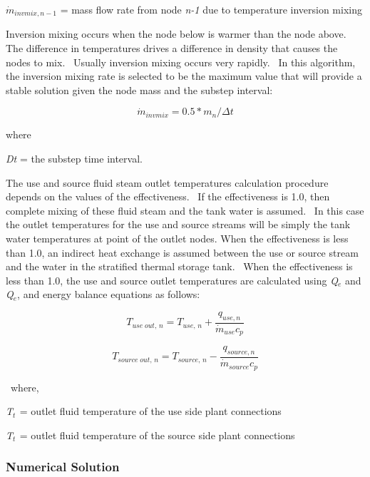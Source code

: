 \({\dot m_{invmix,n - 1}}\) = mass flow rate from node \emph{n-1} due to temperature inversion mixing

Inversion mixing occurs when the node below is warmer than the node above.~ The difference in temperatures drives a difference in density that causes the nodes to mix.~ Usually inversion mixing occurs very rapidly.~ In this algorithm, the inversion mixing rate is selected to be the maximum value that will provide a stable solution given the node mass and the substep interval:

\begin{equation}
{\dot m_{invmix}} = 0.5*{m_n}/\Delta t
\end{equation}

where

\emph{Dt} = the substep time interval.

The use and source fluid steam outlet temperatures calculation procedure depends on the values of the effectiveness.~ If the effectiveness is 1.0, then complete mixing of these fluid steam and the tank water is assumed.~ In this case the outlet temperatures for the use and source streams will be simply the tank water temperatures at point of the outlet nodes. When the effectiveness is less than 1.0, an indirect heat exchange is assumed between the use or source stream and the water in the stratified thermal storage tank.~ When the effectiveness is less than 1.0, the use and source outlet temperatures are calculated using \emph{Q\(_{e}\)} and \emph{Q\(_{e}\)}, and energy balance equations as follows:

\begin{equation}
{T_{use\;out,\,n}} = {T_{use,\,n}} + \frac{{{q_{use,n}}}}{{{{\dot m}_{use}}{c_p}}}
\end{equation}

\begin{equation}
{T_{source\;out,\,n}} = {T_{source,\,n}} - \frac{{{q_{source,n}}}}{{{{\dot m}_{source}}{c_p}}}
\end{equation}

~where,

\emph{T\(_{t}\)}\(_{ }\) = outlet fluid temperature of the use side plant connections

\emph{T\(_{t}\)}\(_{ }\) = outlet fluid temperature of the source side plant connections

\subsubsection{Numerical Solution}\label{numerical-solution}

